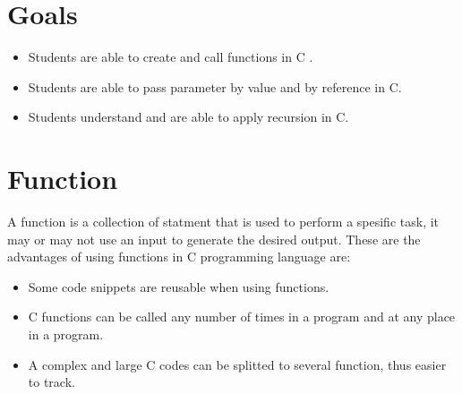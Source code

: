 \section{Goals}
\begin{itemize}[label=$\bullet$, itemsep=-1pt, leftmargin=*]
    \item Students are able to create and call functions in C .
    \item Students are able to pass parameter by value and by reference in C.
    \item Students understand and are able to apply recursion in C.

\end{itemize}

\section{Function}
A function is a collection of statment that is used to perform a spesific task, it may or may not use an input to generate the desired output.
These are the advantages of using functions in C programming language are:
\begin{itemize}
    \item Some code snippets are reusable when using functions.
    \item C functions can be called any number of times in a program and at any place in a program.
    \item A complex and large C codes can be splitted to several function, thus easier to track.
\end{itemize}
